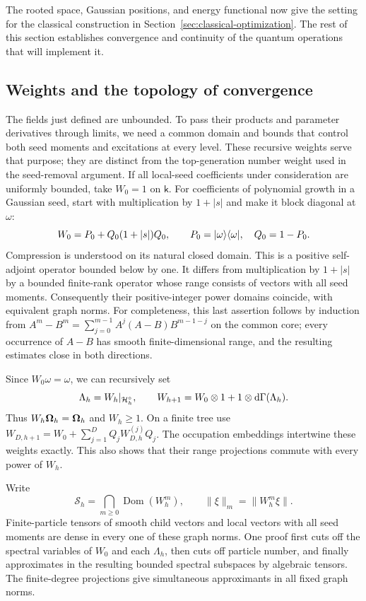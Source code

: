 The rooted space, Gaussian positions, and energy functional now give
the setting for the classical construction in
Section~\ref{sec:classical-optimization}. The rest of this section
establishes convergence and continuity of the quantum operations that
will implement it.

\subsection{Weights and the topology of convergence}
\label{sec:smooth-topology}

The fields just defined are unbounded.  To pass their products and
parameter derivatives through limits, we need a common domain and
bounds that control both seed moments and excitations at every level.
These recursive weights serve that purpose; they are distinct from
the top-generation number weight used in the seed-removal argument.
If all local-seed coefficients under consideration are uniformly
bounded, take $W_0=1$ on $\mathsf k$.  For coefficients of polynomial
growth in a Gaussian seed, start with multiplication by $1+|s|$
and make it block diagonal at $\omega$:
\[
 W_0=P_0+Q_0(1+|s|)Q_0,
 \qquad P_0=\lvert \omega\rangle\langle \omega\rvert,\quad Q_0=1-P_0.
\]
Compression is understood on its natural closed domain.  This is
a positive self-adjoint operator bounded below by one.  It differs
from multiplication by $1+|s|$ by a bounded finite-rank operator
whose range consists of vectors with all seed moments.  Consequently
their positive-integer power domains coincide, with equivalent
graph norms.  For completeness, this last assertion follows by
induction from $A^m-B^m=\sum_{j=0}^{m-1}A^j(A-B)B^{m-1-j}$ on the
common core; every occurrence of $A-B$ has smooth finite-dimensional
range, and the resulting estimates close in both directions.

Since $W_0\omega=\omega$, we can recursively set
\begin{equation}\label{eq:recursive-weights}
 \Lambda_h=W_h|_{\mathcal H_h^\circ},\qquad
 W_{h+1}=W_0\otimes1+1\otimes\mathrm d\Gamma(\Lambda_h).
\end{equation}
Thus $W_h\boldsymbol\Omega_h=\boldsymbol\Omega_h$ and $W_h\geq1$.  On a finite tree use
$W_{D,h+1}=W_0+\sum_{j=1}^D Q_jW_{D,h}^{(j)}Q_j$.
The occupation embeddings intertwine these weights exactly.  This
also shows that their range projections commute with every power
of $W_h$.

Write
\[
 \mathscr S_h=\bigcap_{m\geq0}\operatorname{Dom}(W_h^m),
 \qquad \|\xi\|_m=\|W_h^m\xi\|.
\]
Finite-particle tensors of smooth child vectors and local vectors
with all seed moments are dense in every one of these graph norms.
One proof first cuts off the spectral variables of $W_0$ and each
$\Lambda_h$, then cuts off particle number, and finally approximates
in the resulting bounded spectral subspaces by algebraic tensors.
The finite-degree projections give simultaneous approximants in all
fixed graph norms.

